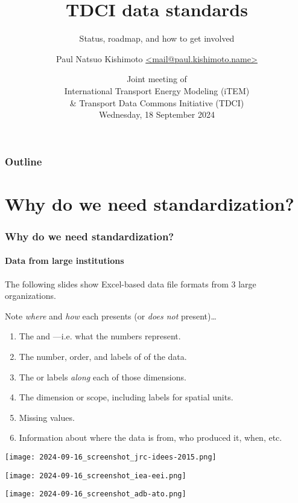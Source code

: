\documentclass[12pt,aspectratio=169]{beamer}
\title{TDCI data standards}
\subtitle{Status, roadmap, and how to get involved}
\date{
  \texorpdfstring{Joint meeting of \\
  International Transport Energy Modeling (iTEM)\\
  \& Transport Data Commons Initiative (TDCI) \\
  Wednesday, 18 September 2024}%
  {2024-09-18}}
\author{\texorpdfstring{Paul Natsuo Kishimoto\scriptsize\newline
  \href{mailto:mail@paul.kishimoto.name}%
       {\ttfamily <mail@paul.kishimoto.name>}}%
  {Paul Natsuo Kishimoto <mail@paul.kishimoto.name>}}
\begin{document}
\maketitle

\begin{frame}
\frametitle{Outline}

\tableofcontents

\end{frame}

\section{Why do we need standardization?}

\begin{frame}
\frametitle{Why do we need standardization?}
\framesubtitle{Data from large institutions}

The following slides show Excel-based data file formats from 3 large organizations.

\medskip
Note \emph{where} and \emph{how} each presents (or \emph{does not} present)…
\begin{enumerate}
  \item The  and  —i.e. what the numbers represent.
  \item The number, order, and labels of  of the data.
  \item The  or labels \emph{along} each of those dimensions.
  \item The  dimension or scope, including labels for spatial units.
  \item Missing values.
  \item Information about where the data is from, who produced it, when, etc.
\end{enumerate}

\end{frame}

\begin{frame}[plain]
\hspace*{-10mm}
\texttt{[image: 2024-09-16\_screenshot\_jrc-idees-2015.png]}
\end{frame}
\begin{frame}[plain]
\hspace*{-10mm}
\texttt{[image: 2024-09-16\_screenshot\_iea-eei.png]}
\end{frame}
\begin{frame}[plain]
\hspace*{-10mm}
\texttt{[image: 2024-09-16\_screenshot\_adb-ato.png]}
\end{frame}
\end{document}
